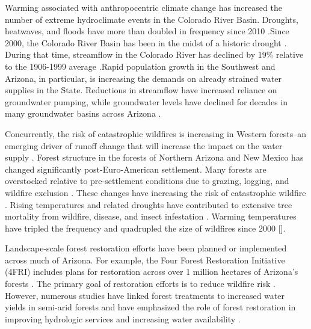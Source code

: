 \documentclass[
  number]{elsarticle}
\begin{document}
Warming associated with anthropocentric climate change has increased the
number of extreme hydroclimate events in the Colorado River Basin.
Droughts, heatwaves, and floods have more than doubled in frequency
since 2010 \citep{bennett_concurrent_2021}.Since 2000, the Colorado
River Basin has been in the midst of a historic drought
\citep{meko_treering_2022, williams_rapid_2022}. During that time,
streamflow in the Colorado River has declined by 19\% relative to the
1906-1999 average
\citep{hogan_recent_2024, udall_twentyfirst_2017}.Rapid population
growth in the Southwest and Arizona, in particular, is increasing the
demands on already strained water supplies in the State. Reductions in
streamflow have increased reliance on groundwater pumping, while
groundwater levels have declined for decades in many groundwater basins
across Arizona \citep{tadych_historical_2024}.

Concurrently, the risk of catastrophic wildfires is increasing in
Western forests--an emerging driver of runoff change that will increase
the impact on the water supply \citep{williams_rapid_2022}. Forest
structure in the forests of Northern Arizona and New Mexico has changed
significantly post-Euro-American settlement. Many forests are
overstocked relative to pre-settlement conditions due to grazing,
logging, and wildfire exclusion
\citep{covington_southwestern_1994, friederici2013}. These changes have
increasing the risk of catastrophic wildfire
\citep{allen_ecological_2002}. Rising temperatures and related droughts
have contributed to extensive tree mortality from wildfire, disease, and
insect infestation \citep{berner_tree_2017}. Warming temperatures have
tripled the frequency and quadrupled the size of wildfires since 2000
{[}\citep{iglesias2022}{]}.

Landscape-scale forest restoration efforts have been planned or
implemented across much of Arizona. For example, the Four Forest
Restoration Initiative (4FRI) includes plans for restoration across over
1 million hectares of Arizona's forests
\citep{schultz_collaborative_2012}. The primary goal of restoration
efforts is to reduce wildfire risk
\citep{allen_ecological_2002, friederici2013}. However, numerous studies
have linked forest treatments to increased water yields in semi-arid
forests and have emphasized the role of forest restoration in improving
hydrologic services and increasing water availability
\citep{bosch_review_1982, baker_effects_1986, gottfried_moderate_1991, smerdon_overview_2009, zou_streamflow_2010, wyatt_estimating_2013, moreno_modeling_2015, simonit_impact_2015, wyatt_semiarid_2015, odonnell_forest_2018, schenk_impacts_2020, hibbert1979}.
\end{document}
